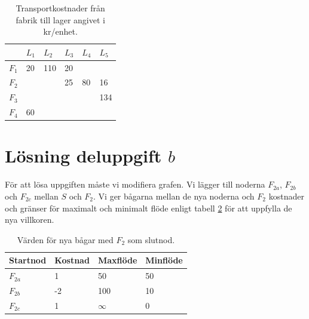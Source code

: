 \documentclass[titlepage, a4paper]{article}
\begin{document}
\begin{table}[h!]
    \centering
    \begin{tabular}{ | l | l | l | l | l | l | }
        \hline
        {} & {$L_{1}$} & {$L_{2}$} & {$L_{3}$} & {$L_{4}$} & {$L_{5}$} \\\hline
        {$F_{1}$} & {20} & {110} & {20} & {} & {} \\\hline
        {$F_{2}$} & {} & {} & {25} & {80} & {16} \\\hline
        {$F_{3}$} & {} & {} & {} & {} & {134} \\\hline
        {$F_{4}$} & {60} & {} & {} & {} & {} \\\hline
    \end{tabular}
    \caption{Transportkostnader från fabrik till lager angivet i kr/enhet.} \label{uppgifta-flode}
\end{table}

\newpage

\section{Lösning deluppgift $b$}

För att lösa uppgiften måste vi modifiera grafen. Vi lägger till noderna $F_{2a}$, $F_{2b}$ och $F_{2c}$ mellan $S$ och $F_{2}$. Vi ger bågarna mellan de nya noderna och $F_{2}$ kostnader och gränser för maximalt och minimalt flöde enligt tabell \ref{uppgiftb-bagar} för att uppfylla de nya villkoren.

\begin{table}[h!]
    \centering
    \begin{tabular}{ | l | l | l | l | }
        \hline
        {\textbf{Startnod}} & {\textbf{Kostnad}} & {\textbf{Maxflöde}} & {\textbf{Minflöde}} \\\hline
        {$F_{2a}$} & {1} & {50} & {50} \\\hline
        {$F_{2b}$} & {-2} & {100} & {10} \\\hline
        {$F_{2c}$} & {1} & {$\infty$} & {0} \\\hline
    \end{tabular}
    \caption{Värden för nya bågar med $F_{2}$ som slutnod.} \label{uppgiftb-bagar}
\end{table}
\end{document}
